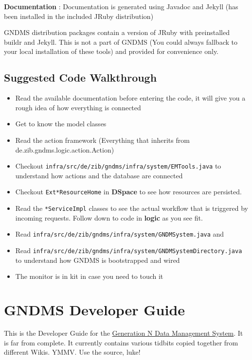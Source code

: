 \documentclass{article}
\begin{document}
\textbf{Documentation} : Documentation is generated using Javadoc
and Jekyll (has been installed in the included JRuby distribution)

GNDMS distribution packages contain a version of JRuby with
preinstalled buildr and Jekyll. This is not a part of GNDMS (You
could always fallback to your local installation of these tools)
and provided for convenience only.

\subsection{Suggested Code Walkthrough}

\begin{itemize}
\item
  Read the available documentation before entering the code, it will
  give you a rough idea of how everything is connected
\item
  Get to know the model classes
\item
  Read the action framework (Everything that inherits from
  de.zib.gndms.logic.action.Action)
\item
  Checkout \verb!infra/src/de/zib/gndms/infra/system/EMTools.java! to
  understand how actions and the database are connected
\item
  Checkout \verb!Ext*ResourceHome! in \textbf{DSpace} to see how
  resources are persisted.
\item
  Read the \verb!*ServiceImpl! classes to see the actual workflow
  that is triggered by incoming requests. Follow down to code in
  \textbf{logic} as you see fit.
\item
  Read \verb!infra/src/de/zib/gndms/infra/system/GNDMSystem.java! and
\item
  Read \verb!infra/src/de/zib/gndms/infra/system/GNDMSystemDirectory.java!
  to understand how GNDMS is bootstrapped and wired
\item
  The monitor is in kit in case you need to touch it
\end{itemize}

\section{GNDMS Developer Guide}

This is the Developer Guide for the
\href{../index.html}{Generation N Data Management System}. It is
far from complete. It currently contains various tidbits copied
together from different Wikis. YMMV. Use the source, luke!
\end{document}
